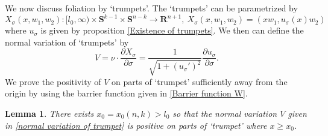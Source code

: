 \documentclass[pdflatex,sn-mathphys-num]{sn-jnl}
\newtheorem{lemma}[theorem]{Lemma}
\begin{document}
We now discuss foliation by `trumpets'. The `trumpets' can be parametrized by
$$ X_{\sigma}(x, w_1, w_2) : [l_0, \infty) \times \mathbf{S}^{k-1} \times \mathbf{S}^{n-k} \to \mathbf{R}^{n+1}, \ X_{\sigma}(x, w_1, w_2) = (xw_1, u_{\sigma}(x)w_2)$$
where $u_{\sigma}$ is given by proposition \ref{Existence of trumpets}.
We then can define the normal variation of `trumpets' by
\begin{equation}\label{normal variation of trumpet}
    V = \nu \cdot \frac{\partial X_{\sigma}}{\partial \sigma} = \frac{1}{\sqrt{1 + (u_{\sigma}')^2}}\frac{\partial u_{\sigma}}{\partial \sigma}.
\end{equation}
We prove the positivity of $V$ on parts of `trumpet' sufficiently away from the origin by using the barrier function given in \eqref{Barrier function W}.
\begin{lemma}\label{nonvanishing of normal variation of trumpets}
    There exists $x_0 = x_0(n,k) > l_0$ so that the normal variation $V$ given in \eqref{normal variation of trumpet} is positive 
    on parts of `trumpet' where $x \geq x_0$.
\end{lemma}
\end{document}
